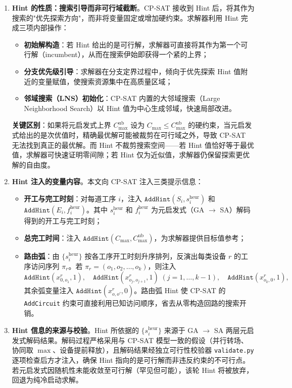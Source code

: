 \documentclass[12pt,a4paper]{ctexart}
\begin{document}
\begin{enumerate}[leftmargin=2.2em, label=(\arabic*)]
\item \textbf{Hint 的性质：搜索引导而非可行域截断}。CP-SAT 接收到 Hint 后，将其作为搜索的"优先探索方向"，而非将变量固定或增加硬约束。求解器利用 Hint 完成三项内部操作：
\begin{itemize}
\item \textbf{初始解构造}：若 Hint 给出的是可行解，求解器可直接将其作为第一个可行解（incumbent），从而在搜索伊始即获得一个紧的上界；
\item \textbf{分支优先级引导}：求解器在分支定界过程中，倾向于优先探索 Hint 值附近的变量赋值，使搜索资源集中在高质量区域；
\item \textbf{邻域搜索（LNS）初始化}：CP-SAT 内置的大邻域搜索（Large Neighborhood Search）以 Hint 值为中心生成邻域，快速局部改进。
\end{itemize}
\textbf{关键区别}：如果将元启发式上界 $C_{\max}^{\mathrm{ub}}$ 设为 $C_{\max}\le C_{\max}^{\mathrm{ub}}$ 的硬约束，当元启发式给出的是次优值时，精确最优解可能被裁剪在可行域之外，导致 CP-SAT 无法找到真正的最优解。而 Hint 不裁剪搜索空间——若 Hint 值恰好等于最优值，求解器可快速证明零间隙；若 Hint 仅为近似值，求解器仍保留探索更优解的自由度。

\item \textbf{Hint 注入的变量内容}。本文向 CP-SAT 注入三类提示信息：
\begin{itemize}
\item \textbf{开工与完工时刻}：对每道工序 $i$，注入 $\texttt{AddHint}(S_i, s_i^{\text{heur}})$ 和 $\texttt{AddHint}(E_i, f_i^{\text{heur}})$。其中 $s_i^{\text{heur}}$ 和 $f_i^{\text{heur}}$ 为元启发式（GA $\rightarrow$ SA）解码得到的开工与完工时刻；
\item \textbf{总完工时间}：注入 $\texttt{AddHint}(C_{\max}, C_{\max}^{\mathrm{ub}})$，为求解器提供目标值参考；
\item \textbf{路由弧}：由 $\{s_i^{\text{heur}}\}$ 按各工序开工时刻升序排列，反演出每类设备 $r$ 的工序访问序列 $\pi_r$。若 $\pi_r=(o_1,o_2,\dots,o_k)$，则注入
\[
\texttt{AddHint}(x^{r}_{0,o_1}, 1),\quad
\texttt{AddHint}(x^{r}_{o_j,o_{j+1}}, 1)\;(j=1,\dots,k-1),\quad
\texttt{AddHint}(x^{r}_{o_k,0}, 1),
\]
其余弧变量注入 $\texttt{AddHint}(x^{r}_{o,o'}, 0)$。路由弧 Hint 使 CP-SAT 的 \texttt{AddCircuit} 约束可直接利用已知访问顺序，省去从零构造回路的搜索开销。
\end{itemize}

\item \textbf{Hint 信息的来源与校验}。Hint 所依据的 $\{s_i^{\text{heur}}\}$ 来源于 GA $\rightarrow$ SA 两层元启发式解码结果。解码过程严格采用与 CP-SAT 模型一致的假设（并行转场、协同取 $\max$、设备提前释放），且解码结果经独立可行性校验器 \texttt{validate.py} 逐项检查后方才注入，确保 Hint 指向的是可行解而非违反约束的不可行点。若元启发式因随机性未能收敛至可行解（罕见但可能），该轮 Hint 将被放弃，回退为纯冷启动求解。


\end{enumerate}
\end{document}
